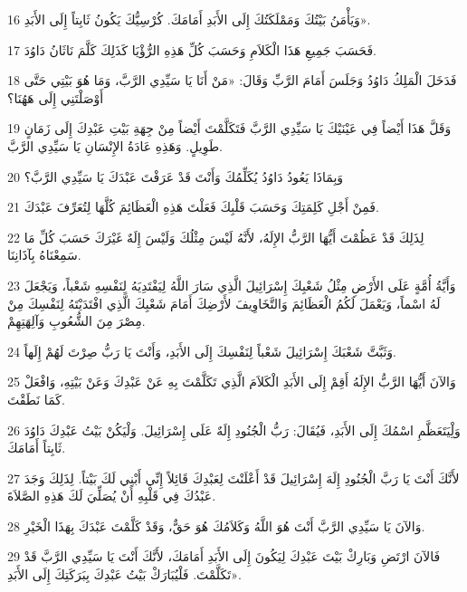 \par 16 وَيَأْمَنُ بَيْتُكَ وَمَمْلَكَتُكَ إِلَى الأَبَدِ أَمَامَكَ. كُرْسِيُّكَ يَكُونُ ثَابِتاً إِلَى الأَبَدِ».
\par 17 فَحَسَبَ جَمِيعِ هَذَا الْكَلاَمِ وَحَسَبَ كُلِّ هَذِهِ الرُّؤْيَا كَذَلِكَ كَلَّمَ نَاثَانُ دَاوُدَ.
\par 18 فَدَخَلَ الْمَلِكُ دَاوُدُ وَجَلَسَ أَمَامَ الرَّبِّ وَقَالَ: «مَنْ أَنَا يَا سَيِّدِي الرَّبَّ، وَمَا هُوَ بَيْتِي حَتَّى أَوْصَلْتَنِي إِلَى هَهُنَا؟
\par 19 وَقَلَّ هَذَا أَيْضاً فِي عَيْنَيْكَ يَا سَيِّدِي الرَّبَّ فَتَكَلَّمْتَ أَيْضاً مِنْ جِهَةِ بَيْتِ عَبْدِكَ إِلَى زَمَانٍ طَوِيلٍ. وَهَذِهِ عَادَةُ الإِنْسَانِ يَا سَيِّدِي الرَّبَّ.
\par 20 وَبِمَاذَا يَعُودُ دَاوُدُ يُكَلِّمُكَ وَأَنْتَ قَدْ عَرَفْتَ عَبْدَكَ يَا سَيِّدِي الرَّبَّ؟
\par 21 فَمِنْ أَجْلِ كَلِمَتِكَ وَحَسَبَ قَلْبِكَ فَعَلْتَ هَذِهِ الْعَظَائِمَ كُلَّهَا لِتُعَرِّفَ عَبْدَكَ.
\par 22 لِذَلِكَ قَدْ عَظُمْتَ أَيُّهَا الرَّبُّ الإِلَهُ، لأَنَّهُ لَيْسَ مِثْلُكَ وَلَيْسَ إِلَهٌ غَيْرَكَ حَسَبَ كُلِّ مَا سَمِعْنَاهُ بِآذَانِنَا.
\par 23 وَأَيَّةُ أُمَّةٍ عَلَى الأَرْضِ مِثْلُ شَعْبِكَ إِسْرَائِيلَ الَّذِي سَارَ اللَّهُ لِيَفْتَدِيَهُ لِنَفْسِهِ شَعْباً، وَيَجْعَلَ لَهُ اسْماً، وَيَعْمَلَ لَكُمُ الْعَظَائِمَ وَالتَّخَاوِيفَ لأَرْضِكَ أَمَامَ شَعْبِكَ الَّذِي افْتَدَيْتَهُ لِنَفْسِكَ مِنْ مِصْرَ مِنَ الشُّعُوبِ وَآلِهَتِهِمْ.
\par 24 وَثَبَّتَّ شَعْبَكَ إِسْرَائِيلَ شَعْباً لِنَفْسِكَ إِلَى الأَبَدِ، وَأَنْتَ يَا رَبُّ صِرْتَ لَهُمْ إِلَهاً.
\par 25 وَالآنَ أَيُّهَا الرَّبُّ الإِلَهُ أَقِمْ إِلَى الأَبَدِ الْكَلاَمَ الَّذِي تَكَلَّمْتَ بِهِ عَنْ عَبْدِكَ وَعَنْ بَيْتِهِ، وَافْعَلْ كَمَا نَطَقْتَ.
\par 26 وَلِْيَتَعَظَّمِ اسْمُكَ إِلَى الأَبَدِ، فَيُقَالَ: رَبُّ الْجُنُودِ إِلَهٌ عَلَى إِسْرَائِيلَ. وَلْيَكُنْ بَيْتُ عَبْدِكَ دَاوُدَ ثَابِتاً أَمَامَكَ.
\par 27 لأَنَّكَ أَنْتَ يَا رَبَّ الْجُنُودِ إِلَهَ إِسْرَائِيلَ قَدْ أَعْلَنْتَ لِعَبْدِكَ قَائِلاً إِنِّي أَبْنِي لَكَ بَيْتاً. لِذَلِكَ وَجَدَ عَبْدُكَ فِي قَلْبِهِ أَنْ يُصَلِّيَ لَكَ هَذِهِ الصَّلاَةَ.
\par 28 وَالآنَ يَا سَيِّدِي الرَّبَّ أَنْتَ هُوَ اللَّهُ وَكَلاَمُكَ هُوَ حَقٌّ، وَقَدْ كَلَّمْتَ عَبْدَكَ بِهَذَا الْخَيْرِ.
\par 29 فَالآنَ ارْتَضِ وَبَارِكْ بَيْتَ عَبْدِكَ لِيَكُونَ إِلَى الأَبَدِ أَمَامَكَ، لأَنَّكَ أَنْتَ يَا سَيِّدِي الرَّبَّ قَدْ تَكَلَّمْتَ. فَلْيُبَارَكْ بَيْتُ عَبْدِكَ بِبَرَكَتِكَ إِلَى الأَبَدِ».

